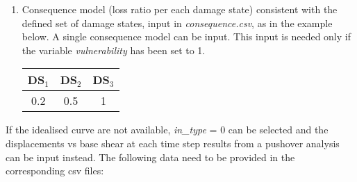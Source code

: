\begin{enumerate}
\item Consequence model (loss ratio per each damage state) consistent with the defined set of damage states, input in \textit{consequence.csv}, as in the example below. A single consequence model can be input. This input is needed only if the variable \textit{vulnerability} has been set to 1.	
	\begin{table}[H]
	\centering
	\begin{tabular}{|c|c|c|} \hline
	\textbf{DS$_1$} & \textbf{DS$_2$} & \textbf{DS$_3$} \\ \hline
	0.2	& 0.5	 & 1\\ \hline
	\end{tabular}
	\end{table}
	
\end{enumerate}

If the idealised curve are not available, \textit{in\_type} = 0 can be selected and the displacements vs base shear at each time step results from a pushover analysis can be input instead. The following data need to be provided in the corresponding csv files:

